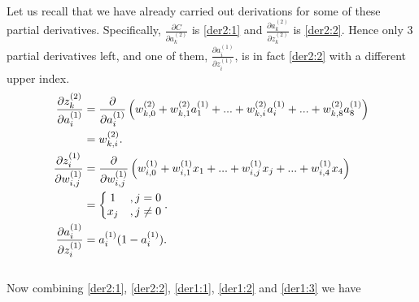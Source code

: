 \documentclass[12pt,titlepage]{article}
\begin{document}
\\Let us recall that we have already carried out derivations for some of these partial derivatives. Specifically, $\frac{\partial C}{\partial a_{k}^{(2)}}$ is \eqref{der2:1} and $\frac{\partial a_{k}^{(2)}}{\partial z_{k}^{(2)}}$ is \eqref{der2:2}. Hence only 3 partial derivatives left, and one of them, $\frac{\partial a_{i}^{(1)}}{\partial z_{i}^{(1)}}$, is in fact \eqref{der2:2} with a different upper index.\\ 
\begin{subequations}
\begin{align}
\frac{\partial z_{k}^{(2)}}{\partial a_{i}^{(1)}}
 & = \frac{\partial }{\partial a_{i}^{(1)}}\left(w_{k,0}^{(2)}+w_{k,1}^{(2)}a_{1}^{(1)}+...+w_{k,i}^{(2)}a_{i}^{(1)}+...+w_{k,8}^{(2)}a_{8}^{(1)} \right )  \notag \\
 & = w_{k,i}^{(2)}. \label{der1:1}\\
\frac{\partial z_{i}^{(1)}}{\partial w_{i,j}^{(1)}}
 & = \frac{\partial }{\partial w_{i,j}^{(1)}}\left(w_{i,0}^{(1)}+w_{i,1}^{(1)}x_{1}+...+w_{i,j}^{(1)}x_{j}+...+w_{i,4}^{(1)}x_{4} \right ) \notag \\
 & =  \left\{\begin{matrix}
1&, j = 0\\ 
x_{j}&, j \neq 0
\end{matrix}\right.. \label{der1:2}\\
\frac{\partial a_{i}^{(1)}}{\partial z_{i}^{(1)}}
 & =a_{i}^{(1)}(1-a_{i}^{(1)}). \label{der1:3}
\end{align}
\end{subequations}
\\Now combining \eqref{der2:1}, \eqref{der2:2}, \eqref{der1:1}, \eqref{der1:2} and \eqref{der1:3} we have
\end{document}
